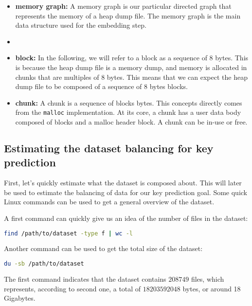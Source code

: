     \begin{itemize}
        \item \textbf{memory graph:} A memory graph is our particular directed graph that represents the memory of a heap dump file. The memory graph is the main data structure used for the embedding step.
        \item \item \textbf{block:} In the following, we will refer to a block as a sequence of 8 bytes. This is because the heap dump file is a memory dump, and memory is allocated in chunks that are multiples of 8 bytes. This means that we can expect the heap dump file to be composed of a sequence of 8 bytes blocks.
        \item \textbf{chunk:} A chunk is a sequence of blocks bytes. This concepts directly comes from the \lstinline[language=c]|malloc| implementation. At its core, a chunk has a user data body composed of blocks and a malloc header block. A chunk can be in-use or free.
    \end{itemize}

    \subsection{Estimating the dataset balancing for key prediction}
    First, let's quickly estimate what the dataset is composed about. This will later be used to estimate the balancing of data for our key prediction goal. Some quick Linux commands can be used to get a general overview of the dataset.
    
    A first command can quickly give us an idea of the number of files in the dataset:
    \begin{lstlisting}[caption={Count all dataset files}, label=methods:code:count_all_dataset_files, language=bash]
        find /path/to/dataset -type f | wc -l
    \end{lstlisting}

    Another command can be used to get the total size of the dataset:
    \begin{lstlisting}[caption={Get the total size of the dataset}, label=methods:code:get_total_size_dataset, language=bash]
        du -sb /path/to/dataset
    \end{lstlisting}

    The first command indicates that the dataset contains $ 208749 $ files, which represents, according to second one, a total of $ 18203592048 $ bytes, or around 18 Gigabytes.

